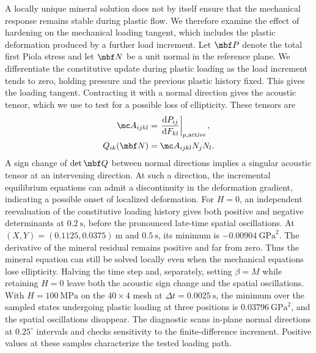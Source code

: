 A locally unique mineral solution does not by itself ensure that the
mechanical response remains stable during plastic flow.  We therefore
examine the effect of hardening on the mechanical loading tangent, which
includes the plastic deformation produced by a further load increment.
Let \(\mbf P\) denote the total first Piola stress and let \(\mbf N\) be a
unit normal in the reference plane.  We differentiate the constitutive
update during plastic loading as the load increment tends to zero, holding
pressure and the previous plastic history fixed.  This gives the loading
tangent.  Contracting it with a normal direction gives the acoustic tensor,
which we use to test for a possible loss of ellipticity.  These tensors are
\begin{align*}
 \mc A_{ijkl}
 &=\left.\frac{\mathrm dP_{ij}}{\mathrm dF_{kl}}\right|_{p,\mathrm{active}},
\\
 Q_{ik}(\mbf N)&=\mc A_{ijkl}N_jN_l.
\end{align*}
A sign change of \(\det\mbf Q\) between normal directions implies a
singular acoustic tensor at an intervening direction.  At such a direction,
the incremental equilibrium equations can admit a discontinuity in the
deformation gradient, indicating a possible onset of localized deformation.
For \(H=0\), an independent reevaluation of the constitutive loading history
gives both positive and negative determinants
at \(0.2\ \mathrm{s}\), before the pronounced late-time spatial oscillations.
At \((X,Y)=(0.1125,0.0375)\ \mathrm{m}\) and \(0.5\ \mathrm{s}\), its
minimum is \(-0.00904\ \mathrm{GPa}^2\).  The derivative of the mineral residual remains positive and far from zero.
Thus the mineral equation can still be solved locally even when the
mechanical equations lose ellipticity.  Halving the time step and, separately, setting
\(\beta=M\) while retaining \(H=0\) leave both the acoustic sign change
and the spatial oscillations.  With \(H=100\ \mathrm{MPa}\) on the
\(40\times4\) mesh at \(\Delta t=0.0025\ \mathrm{s}\), the minimum
over the sampled states undergoing plastic loading at three positions is
\(0.03796\ \mathrm{GPa}^2\), and the spatial oscillations disappear.
The diagnostic scans in-plane normal directions at \(0.25^\circ\) intervals
and checks sensitivity to the finite-difference increment.  Positive values
at these samples characterize the tested loading path.

